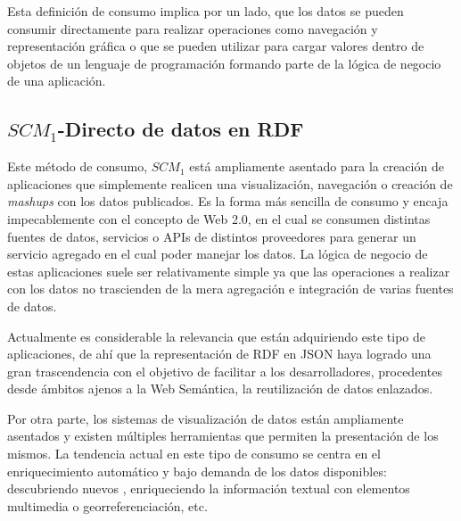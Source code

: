 Esta definición de consumo implica por un lado, que los datos se pueden consumir directamente para realizar operaciones
como navegación y representación gráfica o que se pueden utilizar para cargar valores dentro de objetos
de un lenguaje de programación formando parte de la lógica de negocio de una aplicación.

\subsection{$SCM_1$-Directo de datos en RDF}
Este método de consumo, $SCM_1$ está ampliamente asentado para la creación de aplicaciones
que simplemente realicen una visualización, navegación o creación de \textit{mashups} con los
datos publicados. Es la forma más sencilla de consumo y encaja impecablemente con el concepto
de Web 2.0, en el cual se consumen distintas fuentes de datos, servicios o APIs de distintos
proveedores para generar un servicio agregado en el cual poder manejar los datos. La lógica
de negocio de estas aplicaciones suele ser relativamente simple ya que las operaciones a realizar
con los datos no trascienden de la mera agregación e integración de varias fuentes de datos.

Actualmente es considerable la relevancia que están adquiriendo este tipo de aplicaciones, de ahí que la representación 
de \gls{RDF} en \gls{JSON} haya logrado una gran trascendencia con el objetivo de facilitar a los desarrolladores, procedentes desde ámbitos ajenos a la Web Semántica, 
la reutilización de datos enlazados.

Por otra parte, los sistemas de visualización de datos están ampliamente asentados y existen
múltiples herramientas que permiten la presentación de los mismos. La tendencia actual en este
tipo de consumo se centra en el enriquecimiento automático y bajo demanda de los datos disponibles: descubriendo
nuevos \datasets, enriqueciendo la información textual con elementos multimedia o georreferenciación, etc.



